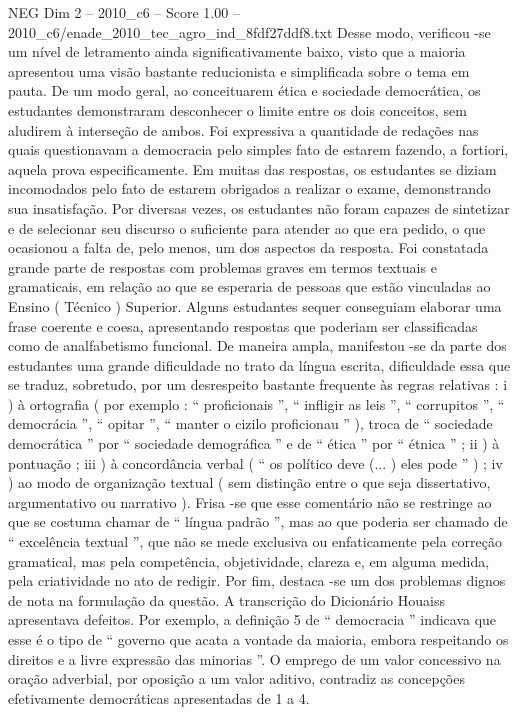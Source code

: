 \begin{textsample}{NEG Dim 2 – 2010\_c6 – Score 1.00 – 2010\_c6/enade\_2010\_tec\_agro\_ind\_8fdf27ddf8.txt}
Desse modo, verificou -se um nível de letramento ainda significativamente baixo, visto que a maioria apresentou uma visão bastante reducionista e simplificada sobre o tema em pauta.
De um modo geral, ao conceituarem ética e sociedade democrática, os estudantes demonstraram desconhecer o limite entre os dois conceitos, sem aludirem à interseção de ambos.
Foi expressiva a quantidade de redações nas quais questionavam a democracia pelo simples fato de estarem fazendo, a fortiori, aquela prova especificamente.
Em muitas das respostas, os estudantes se diziam incomodados pelo fato de estarem obrigados a realizar o exame, demonstrando sua insatisfação.
Por diversas vezes, os estudantes não foram capazes de sintetizar e de selecionar seu discurso o suficiente para atender ao que era pedido, o que ocasionou a falta de, pelo menos, um dos aspectos da resposta.
Foi constatada grande parte de respostas com problemas graves em termos textuais e gramaticais, em relação ao que se esperaria de pessoas que estão vinculadas ao Ensino ( Técnico ) Superior.
Alguns estudantes sequer conseguiam elaborar uma frase coerente e coesa, apresentando respostas que poderiam ser classificadas como de analfabetismo funcional.
De maneira ampla, manifestou -se da parte dos estudantes uma grande dificuldade no trato da língua escrita, dificuldade essa que se traduz, sobretudo, por um desrespeito bastante frequente às regras relativas : i ) à ortografia ( por exemplo : “ proficionais ”, “ infligir as leis ”, “ corrupitos ”, “ democrácia ”, “ opitar ”, “ manter o cizilo proficionau ” ), troca de “ sociedade democrática ” por “ sociedade demográfica ” e de “ ética ” por “ étnica ” ; ii ) à pontuação ; iii ) à concordância verbal ( “ os político deve (... ) eles pode ” ) ; iv ) ao modo de organização textual ( sem distinção entre o que seja dissertativo, argumentativo ou narrativo ).
Frisa -se que esse comentário não se restringe ao que se costuma chamar de “ língua padrão ”, mas ao que poderia ser chamado de “ excelência textual ”, que não se mede exclusiva ou enfaticamente pela correção gramatical, mas pela competência, objetividade, clareza e, em alguma medida, pela criatividade no ato de redigir.
Por fim, destaca -se um dos problemas dignos de nota na formulação da questão.
A transcrição do Dicionário Houaiss apresentava defeitos.
Por exemplo, a definição 5 de “ democracia ” indicava que esse é o tipo de “ governo que acata a vontade da maioria, embora respeitando os direitos e a livre expressão das minorias ”.
O emprego de um valor concessivo na oração adverbial, por oposição a um valor aditivo, contradiz as concepções efetivamente democráticas apresentadas de 1 a 4.

\end{textsample}
